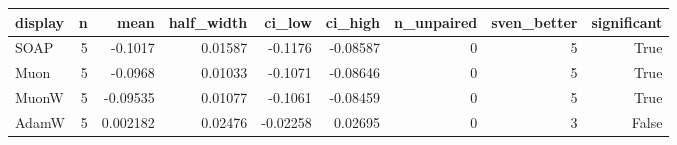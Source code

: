 \begin{tabular}{lrrrrrrrr}
\toprule
display & n & mean & half\_width & ci\_low & ci\_high & n\_unpaired & sven\_better & significant \\
\midrule
SOAP & 5 & -0.1017 & 0.01587 & -0.1176 & -0.08587 & 0 & 5 & True \\
Muon & 5 & -0.0968 & 0.01033 & -0.1071 & -0.08646 & 0 & 5 & True \\
MuonW & 5 & -0.09535 & 0.01077 & -0.1061 & -0.08459 & 0 & 5 & True \\
AdamW & 5 & 0.002182 & 0.02476 & -0.02258 & 0.02695 & 0 & 3 & False \\
\bottomrule
\end{tabular}
